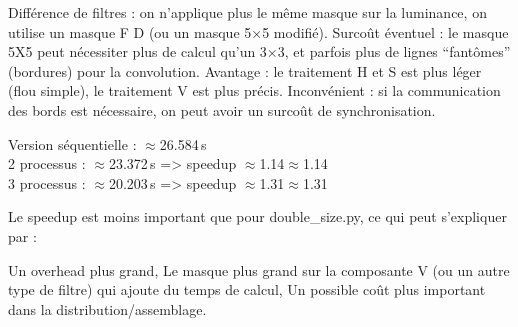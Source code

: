 \documentclass[a4paper,13pt]{book}
\begin{document}
        Différence de filtres : on n’applique plus le même masque sur la luminance, on utilise un masque F D (ou un masque 5×5 modifié).
        Surcoût éventuel : le masque 5X5 peut nécessiter plus de calcul qu’un 3×3, et parfois plus de lignes “fantômes” (bordures) pour la convolution.
        Avantage : le traitement H et S est plus léger (flou simple), le traitement V est plus précis.
        Inconvénient : si la communication des bords est nécessaire, on peut avoir un surcoût de synchronisation.

    
        Version séquentielle : $\approx$26.584 s\\
        2 processus : $\approx$23.372 s => speedup $\approx$1.14$\approx$1.14\\
        3 processus : $\approx$20.203 s => speedup $\approx$1.31$\approx$1.31
    
    Le speedup est moins important que pour double\_size.py, ce qui peut s’expliquer par :
    
        Un overhead plus grand,
        Le masque plus grand sur la composante V (ou un autre type de filtre) qui ajoute du temps de calcul,
        Un possible coût plus important dans la distribution/assemblage.
\end{document}
